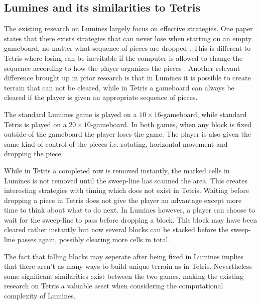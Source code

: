 \subsection{Lumines and its similarities to Tetris}
\label{subsub:sim}

The existing research on Lumines largely focus on effective strategies. One paper states that there exists strategies that can never lose when starting on an empty gameboard, no matter what sequence of pieces are dropped \cite{lumines}. This is different to Tetris where losing can be inevitable if the computer is allowed to change the sequence according to how the player organizes the pieces \cite[p. 4]{tetris}. Another relevant difference brought up in prior research is that in Lumines it is possible to create terrain that can not be cleared, while in Tetris a gameboard can always be cleared if the player is given an appropriate sequence of pieces.

The standard Lumines game is played on a $10 \times 16$-gameboard, while standard Tetris is played on a $20 \times 10$-gameboard. In both games, when any block is fixed outside of the gameboard the player loses the game. The player is also given the same kind of control of the pieces i.e. rotating, horizontal movement and dropping the piece.

While in Tetris a completed row is removed instantly, the marked cells in Lumines is not removed until the sweep-line has scanned the area. This creates interesting strategies with timing which does not exist in Tetris. Waiting before dropping a piece in Tetris does not give the player an advantage except more time to think about what to do next. In Lumines however, a player can choose to wait for the sweep-line to pass before dropping a block. This block may have been cleared rather instantly but now several blocks can be stacked before the sweep-line passes again, possibly clearing more cells in total.

The fact that falling blocks may seperate after being fixed in Lumines implies that there aren't as many ways to build unique terrain as in Tetris. Nevertheless some significant similarities exist between the two games, making the existing research on Tetris a valuable asset when considering the computational complexity of Lumines.

